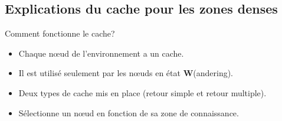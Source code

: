 \documentclass{beamer}
\begin{document}
  \subsection{Explications du cache pour les zones denses}
  \begin{frame}
	Comment fonctionne le cache?
	\begin{itemize}
 		\item Chaque nœud de l'environnement a un cache.
		\item Il est utilisé seulement par les nœuds en état \textbf{W}(andering).
		\item Deux types de cache mis en place (retour simple et retour multiple).
		\item Sélectionne un nœud en fonction de sa zone de connaissance.
	\end{itemize}
  \end{frame}
 
  \begin{frame}
  \end{frame}
	
  \begin{frame}	
  \end{frame}

  \begin{frame}


  \end{frame}
\end{document}
